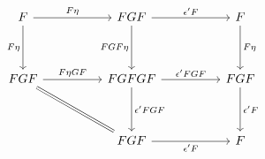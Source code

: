 \[\begin{tikzcd}
	F && FGF && F \\
	\\
	FGF && FGFGF && FGF \\
	\\
	&& FGF && F
	\arrow["F\eta", from=1-1, to=1-3]
	\arrow["{\epsilon'F}", from=1-3, to=1-5]
	\arrow["F\eta", from=1-5, to=3-5]
	\arrow["{\epsilon'F}", from=3-5, to=5-5]
	\arrow["FGF\eta"', from=1-3, to=3-3]
	\arrow["{\epsilon'FGF}", from=3-3, to=3-5]
	\arrow["{\epsilon'F}"', from=5-3, to=5-5]
	\arrow["{\epsilon'FGF}", from=3-3, to=5-3]
	\arrow["F\eta"', from=1-1, to=3-1]
	\arrow["{F\eta GF}", from=3-1, to=3-3]
	\arrow[Rightarrow, no head, from=3-1, to=5-3]
\end{tikzcd}\]
